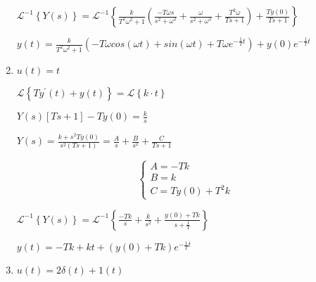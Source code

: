 \documentclass{article}
\begin{document}
\begin{enumerate}[label=\alph*)]
\begin{flushleft}
        $  \mathcal{L}^{-1}\left\{Y\left(s\right)\right\} =  \mathcal{L}^{-1}\left\{\frac{k}{T^{2}\omega^{2}+1}\left( \frac{-T\omega s}{s^{2}+\omega^{2}}+ 
        \frac{\omega}{s^{2}+\omega^{2}}+
        \frac{T^{2}\omega}{Ts+1}\right)+
        \frac{Ty\left(0\right)}{Ts+1}\right\} $
        
        $ y\left(t\right) = \frac{k}{T^{2}\omega^{2}+1}\left(-T\omega cos\left(\omega t\right)+
        sin\left(\omega t\right)+
        T\omega e^{-\frac{1}{T}t}
        \right)+ y\left(0\right)e^{-\frac{1}{T}t} $
        
    \end{flushleft}
        
        
        
        

    \item $u\left(t\right)= t$ 
    \begin{flushleft}
        
        $ \mathcal{L}\left\{T y^{\prime}\left(t\right) + y\left(t\right) \right\}= \mathcal{L}\left\{k\cdot t\right\} $

        $ Y\left(s\right)\left[Ts+1\right]-Ty\left(0\right) = \frac{k}{s} $
        
        $ Y\left(s\right) = \frac{k+s^{2}Ty\left(0\right)}{s^{2}\left(Ts+1\right)} = \frac{A}{s} + \frac{B}{s^{2}} + \frac{C}{Ts+1} $
        
        \[\begin{cases}
            A=-Tk
            \\
            B=k
            \\
            C=Ty\left(0\right)+T^{2}k
        \end{cases}\]

        $ \mathcal{L}^{-1}\left\{Y\left(s\right)\right\} = \mathcal{L}^{-1}\left\{\frac{-Tk}{s} + \frac{k}{s^{2}} + \frac{y\left(0\right)+Tk}{s+\frac{1}{T}}\right\} $

        $ y\left(t\right) = -Tk+kt+\left(y\left(0\right)+Tk\right)e^{-\frac{1}{T}t} $

    \end{flushleft}





    \item $u\left(t\right)=2\delta\left(t\right) + 1 \left(t\right)$ 

    \begin{flushleft}


\end{flushleft}
\end{enumerate}
\end{document}
